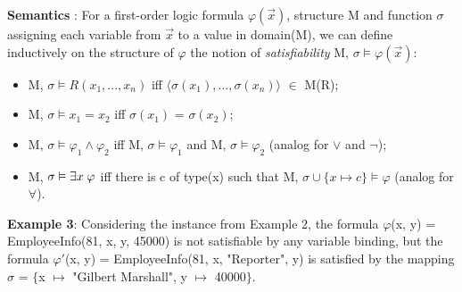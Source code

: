 \documentclass[11pt, a4paper, dvipsnames]{article}
\begin{document}
\textbf{Semantics} : For a first-order logic formula $\varphi(\vec{x})$, structure M and function $\sigma$ assigning each variable from $\vec{x}$ to a value in domain(M), we can define inductively on the structure of $\varphi$ the notion of \textit{satisfiability} M, $\sigma \vDash \varphi(\vec{x})$:
\begin{itemize}
	\item M, $\sigma \vDash R(x_{1}, ..., x_{n})$ iff $\langle\sigma(x_{1}), ..., \sigma(x_{n})\rangle$ $\in$ M(R);
	\item M, $\sigma \vDash x_{1} = x_{2}$ iff $\sigma(x_{1})$ = $\sigma(x_{2})$;
	\item M, $\sigma \vDash \varphi_{1} \wedge \varphi_{2}$ iff M, $\sigma \vDash \varphi_{1}$ and M, $\sigma \vDash \varphi_{2}$ (analog for $\vee$ and $\neg$);
	\item M, $\sigma \vDash \exists x \hspace{0.25em} \varphi$ iff there is c of type(x) such that M, $\sigma \cup \{x \mapsto c\} \vDash \varphi$ (analog for $\forall$).
\end{itemize}
\textbf{Example 3}: Considering the instance from Example 2, the formula \newline $\varphi$(x, y) = EmployeeInfo(81, x, y, 45000) is not satisfiable by any variable binding, but the formula $\varphi'$(x, y) = EmployeeInfo(81, x, "Reporter", y) is satisfied by the mapping\newline $\sigma$ = $\{$x $\mapsto$ "Gilbert Marshall", y $\mapsto$ 40000$\}$.
\end{document}
